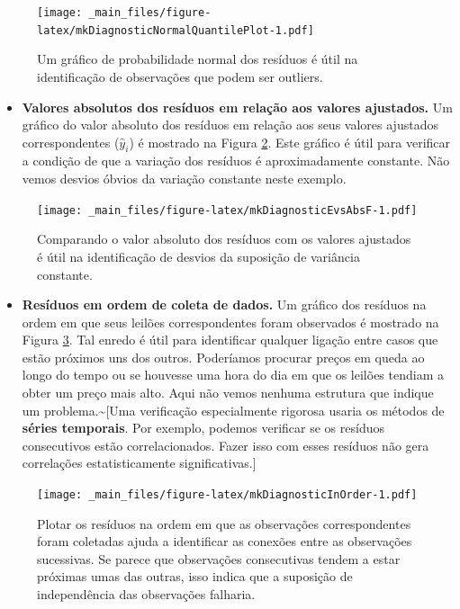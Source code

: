 \documentclass[
]{book}
\providecommand{\tightlist}{%
  \setlength{\itemsep}{0pt}\setlength{\parskip}{0pt}}
\theoremstyle{definition}
\theoremstyle{definition}
\theoremstyle{definition}
\theoremstyle{definition}
\theoremstyle{remark}
\begin{document}
\begin{figure}
\centering
\texttt{[image: \_main\_files/figure-latex/mkDiagnosticNormalQuantilePlot-1.pdf]}
\caption{\label{fig:mkDiagnosticNormalQuantilePlot}Um gráfico de probabilidade normal dos resíduos é útil na identificação de observações que podem ser outliers.}
\end{figure}

\begin{itemize}
\tightlist
\item
  \textbf{Valores absolutos dos resíduos em relação aos valores ajustados.} Um gráfico do valor absoluto dos resíduos em relação aos seus valores ajustados correspondentes (\(\hat{y}_i\)) é mostrado na Figura \ref{fig:mkDiagnosticEvsAbsF}. Este gráfico é útil para verificar a condição de que a variação dos resíduos é aproximadamente constante. Não vemos desvios óbvios da variação constante neste exemplo.
\end{itemize}

\begin{figure}
\centering
\texttt{[image: \_main\_files/figure-latex/mkDiagnosticEvsAbsF-1.pdf]}
\caption{\label{fig:mkDiagnosticEvsAbsF}Comparando o valor absoluto dos resíduos com os valores ajustados é útil na identificação de desvios da suposição de variância constante.}
\end{figure}

\begin{itemize}
\tightlist
\item
  \textbf{Resíduos em ordem de coleta de dados.} Um gráfico dos resíduos na ordem em que seus leilões correspondentes foram observados é mostrado na Figura \ref{fig:mkDiagnosticInOrder}. Tal enredo é útil para identificar qualquer ligação entre casos que estão próximos uns dos outros. Poderíamos procurar preços em queda ao longo do tempo ou se houvesse uma hora do dia em que os leilões tendiam a obter um preço mais alto. Aqui não vemos nenhuma estrutura que indique um problema.\textasciitilde{[}Uma verificação especialmente rigorosa usaria os métodos de \textbf{séries temporais}. Por exemplo, podemos verificar se os resíduos consecutivos estão correlacionados. Fazer isso com esses resíduos não gera correlações estatisticamente significativas.{]}
\end{itemize}

\begin{figure}
\centering
\texttt{[image: \_main\_files/figure-latex/mkDiagnosticInOrder-1.pdf]}
\caption{\label{fig:mkDiagnosticInOrder}Plotar os resíduos na ordem em que as observações correspondentes foram coletadas ajuda a identificar as conexões entre as observações sucessivas. Se parece que observações consecutivas tendem a estar próximas umas das outras, isso indica que a suposição de independência das observações falharia.}
\end{figure}
\end{document}
